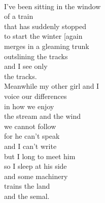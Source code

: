 \documentclass[smalldemyvopaper,11pt,twoside,onecolumn,openright,extrafontsizes]{memoir}
\begin{document}
\\I've been sitting in the window
\\of a train
\\that has suddenly stopped
\\to start the winter [again
\\merges in a gleaming trunk
\\outslining the tracks
\\and I see only
\\the tracks.
\\Meanwhile my other girl and I
\\voice our differences
\\in how we enjoy
\\the stream and the wind
\\we cannot follow
\\for he can't speak
\\and I can't write
\\but I long to meet him
\\so I sleep at his side
\\and some machinery
\\trains the land
\\and the semal.
\end{document}
